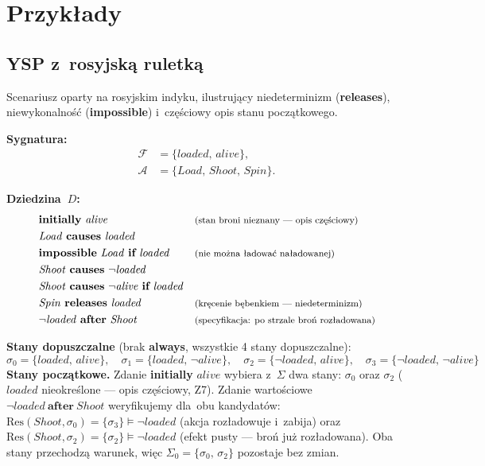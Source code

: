 \documentclass[11pt,a4paper]{article}
\newif\ifshowbib
\newcommand{\bibonly}[1]{\ifshowbib#1\fi}
\renewcommand{\cite}[2][]{\unskip}%
\newcommand{\causes}{\textbf{causes}}
\newcommand{\aft}{\textbf{after}}
\renewcommand{\iff}{\textbf{if}}
\newcommand{\initially}{\textbf{initially}}
\newcommand{\always}{\textbf{always}}
\newcommand{\impossible}{\textbf{impossible}}
\newcommand{\releases}{\textbf{releases}}
\newcommand{\cmt}[1]{\text{\footnotesize\normalfont (#1)}}
\theoremstyle{definition}
\begin{document}
\section{Przykłady}

\subsection{YSP z~rosyjską ruletką}

\noindent Scenariusz oparty na rosyjskim indyku\bibonly{ (\cite{rw02})}, ilustrujący
niedeterminizm (\releases{}), niewykonalność (\impossible{})
i~częściowy opis stanu początkowego.

\medskip
\noindent\textbf{Sygnatura:}
\begin{align*}
  \mathcal{F} &= \{\mathit{loaded},\, \mathit{alive}\}, \\
  \mathcal{A} &= \{\mathit{Load},\, \mathit{Shoot},\, \mathit{Spin}\}.
\end{align*}

\medskip
\noindent\textbf{Dziedzina~$D$:}
{\small
\begin{align*}
  &\initially\ \mathit{alive}
    && \cmt{stan broni nieznany --- opis częściowy} \\
  &\mathit{Load}\ \causes\ \mathit{loaded} \\
  &\impossible\ \mathit{Load}\ \iff\ \mathit{loaded}
    && \cmt{nie można ładować naładowanej} \\
  &\mathit{Shoot}\ \causes\ \neg\mathit{loaded} \\
  &\mathit{Shoot}\ \causes\ \neg\mathit{alive}\ \iff\ \mathit{loaded} \\
  &\mathit{Spin}\ \releases\ \mathit{loaded}
    && \cmt{kręcenie bębenkiem --- niedeterminizm} \\
  &\neg\mathit{loaded}\ \aft\ \mathit{Shoot}
    && \cmt{specyfikacja: po strzale broń rozładowana}
\end{align*}
}

\noindent\textbf{Stany dopuszczalne}
(brak \always{}, wszystkie 4 stany dopuszczalne):
\[
  \sigma_0 = \{\mathit{loaded},\,\mathit{alive}\}, \quad
  \sigma_1 = \{\mathit{loaded},\,\neg\mathit{alive}\}, \quad
  \sigma_2 = \{\neg\mathit{loaded},\,\mathit{alive}\}, \quad
  \sigma_3 = \{\neg\mathit{loaded},\,\neg\mathit{alive}\}
\]
\noindent\textbf{Stany początkowe.} Zdanie \initially{} $\mathit{alive}$
wybiera z~$\Sigma$ dwa stany: $\sigma_0$ oraz $\sigma_2$
($\mathit{loaded}$ nieokreślone --- opis częściowy, Z7).
Zdanie wartościowe $\neg\mathit{loaded}\ \aft\ \mathit{Shoot}$ weryfikujemy
dla~obu kandydatów: $\mathrm{Res}(\mathit{Shoot}, \sigma_0) = \{\sigma_3\}
\models \neg\mathit{loaded}$ (akcja rozładowuje i~zabija) oraz
$\mathrm{Res}(\mathit{Shoot}, \sigma_2) = \{\sigma_2\} \models \neg\mathit{loaded}$
(efekt pusty --- broń już rozładowana). Oba stany przechodzą warunek,
więc $\Sigma_0 = \{\sigma_0,\, \sigma_2\}$ pozostaje bez zmian.
\end{document}
